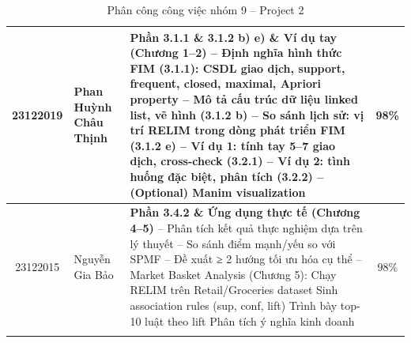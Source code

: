 \documentclass[12pt,a4paper]{report}
\begin{document}
\begin{longtable}{|c|p{3.5cm}|p{7.5cm}|c|}
23122019 & Phan Huỳnh Châu Thịnh &
  \textbf{Phần 3.1.1 \& 3.1.2 b) e) \& Ví dụ tay (Chương 1--2)} \newline
  -- Định nghĩa hình thức FIM (3.1.1): CSDL giao dịch, \newline
  \hspace{1em} support, frequent, closed, maximal, Apriori property \newline
  -- Mô tả cấu trúc dữ liệu linked list, vẽ hình (3.1.2 b) \newline
  -- So sánh lịch sử: vị trí RELIM trong dòng phát triển FIM (3.1.2 e) \newline
  -- Ví dụ 1: tính tay 5--7 giao dịch, cross-check (3.2.1) \newline
  -- Ví dụ 2: tình huống đặc biệt, phân tích (3.2.2) \newline
  -- (Optional) Manim visualization
  & 98\% \\
\hline
 
23122015 & Nguyễn Gia Bảo &
  \textbf{Phần 3.4.2 \& Ứng dụng thực tế (Chương 4--5)} \newline
  -- Phân tích kết quả thực nghiệm dựa trên lý thuyết \newline
  -- So sánh điểm mạnh/yếu so với SPMF \newline
  -- Đề xuất ≥ 2 hướng tối ưu hóa cụ thể \newline
  -- Market Basket Analysis (Chương 5): \newline
  \hspace{1em} Chạy RELIM trên Retail/Groceries dataset \newline
  \hspace{1em} Sinh association rules (sup, conf, lift) \newline
  \hspace{1em} Trình bày top-10 luật theo lift \newline
  \hspace{1em} Phân tích ý nghĩa kinh doanh
  & 98\% \\
\hline
\caption{Phân công công việc nhóm 9 -- Project 2}
\label{tab:work-assignment}
\end{longtable}
 
 
\end{document}
